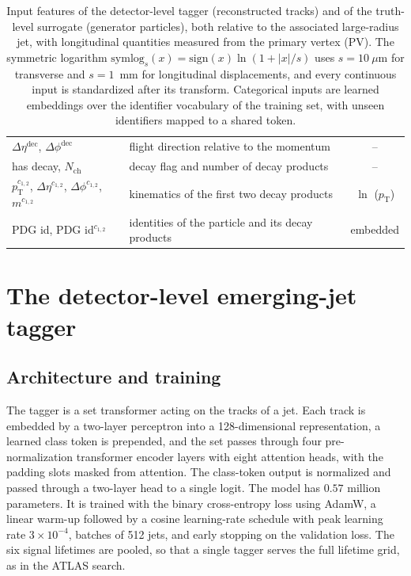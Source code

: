 \documentclass[a4paper,11pt]{article}
\newcommand{\pT}{p_{\mathrm{T}}}
\begin{document}
\begin{table}[htbp]
\begin{tabular}{llc}
    $\Delta\eta^{\mathrm{dec}}$, $\Delta\phi^{\mathrm{dec}}$ & flight direction relative to the momentum & -- \\
    has decay, $N_{\mathrm{ch}}$ & decay flag and number of decay products & -- \\
    $\pT^{c_{1,2}}$, $\Delta\eta^{c_{1,2}}$, $\Delta\phi^{c_{1,2}}$, $m^{c_{1,2}}$ & kinematics of the first two decay products & $\ln$ ($\pT$) \\
    PDG id, PDG id$^{c_{1,2}}$ & identities of the particle and its decay products & embedded \\
    \bottomrule
  \end{tabular}
  \caption{Input features of the detector-level tagger (reconstructed
  tracks) and of the truth-level surrogate (generator particles), both
  relative to the associated large-radius jet, with longitudinal
  quantities measured from the primary vertex (PV). The symmetric logarithm
  $\mathrm{symlog}_{s}(x) = \mathrm{sign}(x)\ln(1 + |x|/s)$ uses
  $s = 10~\mu\mathrm{m}$ for transverse and $s = 1$~mm for
  longitudinal displacements, and every continuous input is
  standardized after its transform. Categorical inputs are learned
  embeddings over the identifier vocabulary of the training set, with
  unseen identifiers mapped to a shared token.}
  \label{tab:features}
\end{table}

\section{The detector-level emerging-jet tagger}
\label{sec:tagger}

\subsection{Architecture and training}

The tagger is a set transformer acting on the tracks of a jet. Each
track is embedded by a two-layer perceptron into a 128-dimensional
representation, a learned class token is prepended, and the set passes
through four pre-normalization transformer encoder layers with eight
attention heads, with the padding slots masked from attention. The
class-token output is normalized and passed through a two-layer head to
a single logit. The model has $0.57$ million parameters. It is trained
with the binary cross-entropy loss using AdamW, a linear warm-up
followed by a cosine learning-rate schedule with peak learning rate
$3\times10^{-4}$, batches of 512 jets, and early stopping on the
validation loss. The six signal lifetimes are pooled, so that a
single tagger serves the full lifetime grid, as in the ATLAS search.
\end{document}

